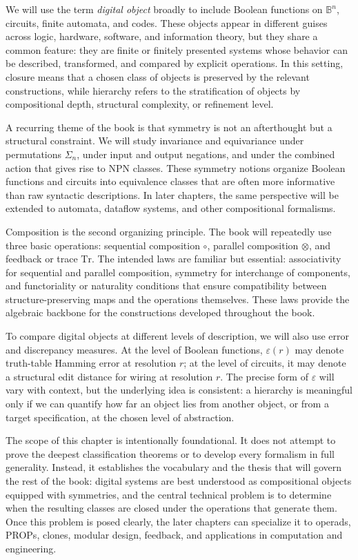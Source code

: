 \documentclass[11pt]{article}
\begin{document}
We will use the term \emph{digital object} broadly to include Boolean functions on \(\mathbb{B}^n\), circuits, finite automata, and codes. These objects appear in different guises across logic, hardware, software, and information theory, but they share a common feature: they are finite or finitely presented systems whose behavior can be described, transformed, and compared by explicit operations. In this setting, closure means that a chosen class of objects is preserved by the relevant constructions, while hierarchy refers to the stratification of objects by compositional depth, structural complexity, or refinement level.

A recurring theme of the book is that symmetry is not an afterthought but a structural constraint. We will study invariance and equivariance under permutations \(\Sigma_n\), under input and output negations, and under the combined action that gives rise to NPN classes. These symmetry notions organize Boolean functions and circuits into equivalence classes that are often more informative than raw syntactic descriptions. In later chapters, the same perspective will be extended to automata, dataflow systems, and other compositional formalisms.

Composition is the second organizing principle. The book will repeatedly use three basic operations: sequential composition \(\circ\), parallel composition \(\otimes\), and feedback or trace \(\mathrm{Tr}\). The intended laws are familiar but essential: associativity for sequential and parallel composition, symmetry for interchange of components, and functoriality or naturality conditions that ensure compatibility between structure-preserving maps and the operations themselves. These laws provide the algebraic backbone for the constructions developed throughout the book.

To compare digital objects at different levels of description, we will also use error and discrepancy measures. At the level of Boolean functions, \(\varepsilon(r)\) may denote truth-table Hamming error at resolution \(r\); at the level of circuits, it may denote a structural edit distance for wiring at resolution \(r\). The precise form of \(\varepsilon\) will vary with context, but the underlying idea is consistent: a hierarchy is meaningful only if we can quantify how far an object lies from another object, or from a target specification, at the chosen level of abstraction.

The scope of this chapter is intentionally foundational. It does not attempt to prove the deepest classification theorems or to develop every formalism in full generality. Instead, it establishes the vocabulary and the thesis that will govern the rest of the book: digital systems are best understood as compositional objects equipped with symmetries, and the central technical problem is to determine when the resulting classes are closed under the operations that generate them. Once this problem is posed clearly, the later chapters can specialize it to operads, PROPs, clones, modular design, feedback, and applications in computation and engineering.
\end{document}
